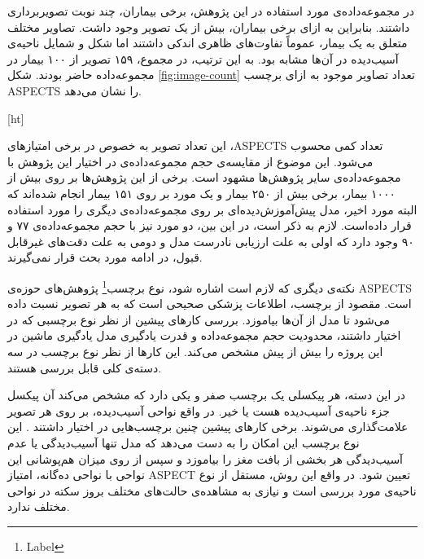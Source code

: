 در مجموعه‌داده‌ی مورد استفاده در این پژوهش، برخی بیماران، چند نوبت تصویربرداری داشتند.
بنابراین به ازای برخی بیماران، بیش از یک تصویر وجود داشت.
تصاویر مختلف متعلق به یک بیمار، عموماً تفاوت‌های ظاهری اندکی داشتند اما شکل و شمایل ناحیه‌ی آسیب‌دیده در آن‌ها مشابه بود.
به این ترتیب، در مجموع، ۱۵۹ تصویر از ۱۰۰ بیمار در مجموعه‌داده حاضر بودند.
شکل \ref{fig:image-count} 
تعداد تصاویر موجود 
به ازای برچسب ASPECTS را نشان می‌دهد.


[ht]

این تعداد تصویر به خصوص در برخی امتیاز‌های ،ASPECTS تعداد کمی محسوب می‌شود.
این موضوع از مقایسه‌ی حجم مجموعه‌داده‌ی در اختیار این پژوهش با مجموعه‌داده‌ی 
سایر پژوهش‌ها مشهود است.
برخی از این پژوهش‌ها 
\cite{cao2022deep,upadhyay2023deep,chen2022improving}
بر روی 
بیش از ۱۰۰۰ بیمار، برخی 
\cite{lee2023clinical,chiang2022deep,jung2018evaluating,kuang2019automated,kuang2021eis}
بیش از ۲۵۰ بیمار
و یک مورد 
\cite{naganuma2021alberta}
 بر روی ۱۵۱ بیمار 
انجام شده‌اند که البته مورد اخیر، مدل پیش‌آموزش‌دیده‌ای بر روی مجموعه‌داده‌ی دیگری را مورد استفاده قرار داده‌است.
لازم به ذکر است، در این بین، دو مورد
\cite{golkonda2022automated,yu2021automated}
نیز با حجم مجموعه‌داده‌ی ۷۷ و ۹۰ وجود دارد
که اولی به علت ارزیابی نادرست مدل و دومی به علت دقت‌های غیرقابل قبول، در ادامه مورد بحث قرار نمی‌گیرند.


نکته‌ی دیگری که لازم است اشاره شود، نوع 
برچسب\footnote{Label}
پژوهش‌های 
حوزه‌ی ASPECTS است.
مقصود از برچسب، اطلاعات پزشکی صحیحی است که به هر تصویر نسبت داده می‌شود تا مدل از آن‌ها بیاموزد.
بررسی کار‌های پیشین از نظر نوع برچسبی که در اختیار داشتند، محدودیت حجم مجموعه‌داده و قدرت یادگیری مدل یادگیری ماشین در این پروژه را بیش از پیش مشخص می‌کند.
این کار‌ها از نظر نوع برچسب در سه دسته‌ی کلی قابل بررسی هستند. 

در این دسته،
هر پیکسلی یک برچسب صفر و یکی دارد که مشخص می‌کند آن پیکسل جزء ناحیه‌ی آسیب‌دیده هست یا خیر.
در واقع نواحی آسیب‌دیده، بر روی هر تصویر علامت‌گذاری می‌شوند.
برخی کار‌های پیشین
چنین برچسب‌هایی در اختیار داشتند \cite{cao2022deep,upadhyay2023deep,kuang2021eis,chen2022improving}.
این نوع برچسب این امکان را به دست می‌دهد که مدل تنها آسیب‌دیدگی یا عدم آسیب‌دیدگی هر بخشی از بافت مغز را بیاموزد و سپس از روی میزان هم‌پوشانی این نواحی با نواحی ده‌گانه، امتیاز ASPECT تعیین شود.
در واقع این روش، مستقل از نوع ناحیه‌ی مورد بررسی است و نیازی به مشاهده‌ی حالت‌های مختلف بروز سکته در نواحی مختلف ندارد.

